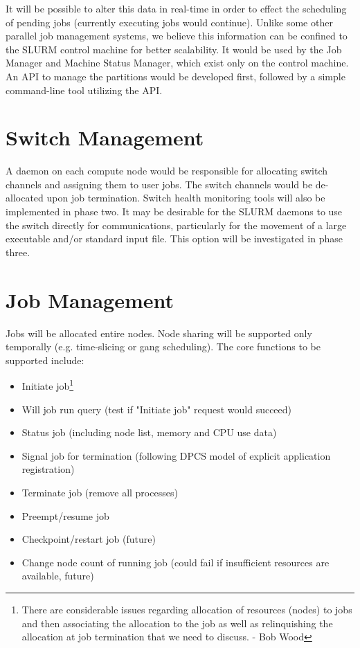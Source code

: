 It will be possible to alter this data in real-time in order to effect the
scheduling of pending jobs (currently executing jobs would continue). Unlike some
other parallel job management systems, we believe this information can be
confined to the SLURM control machine for better scalability. It would be used
by the Job Manager and Machine Status Manager, which exist only on the control
machine. An API to manage the partitions would be developed first, followed by
a simple command-line tool utilizing the API.

\section{Switch Management}

A daemon on each compute node would be responsible for allocating switch
channels and assigning them to user jobs. The switch channels would be
de-allocated upon job termination. Switch health monitoring tools will 
also be implemented in phase two. It may be desirable for the SLURM daemons to use the
switch directly for communications, particularly for the movement of a large 
executable and/or standard input file. This option will be investigated in phase
three. 

\section{Job Management}

Jobs will be allocated entire nodes. Node sharing will be supported only temporally (e.g.
time-slicing or  gang scheduling). The core functions to be supported include:
\begin{itemize}
\item Initiate job\footnote{There are considerable issues regarding allocation 
of resources (nodes) to jobs and then associating the  allocation to the job 
as well as relinquishing the allocation at job termination that we need to 
discuss. - Bob Wood}
\item Will job run query (test if "Initiate job" request would succeed)
\item Status job (including node list, memory and CPU use data)
\item Signal job for termination (following DPCS model of explicit application
registration)
\item Terminate job (remove all processes)
\item Preempt/resume job 
\item Checkpoint/restart job (future)
\item Change node count of running job (could fail if insufficient resources are 
available, future)
\end{itemize}

